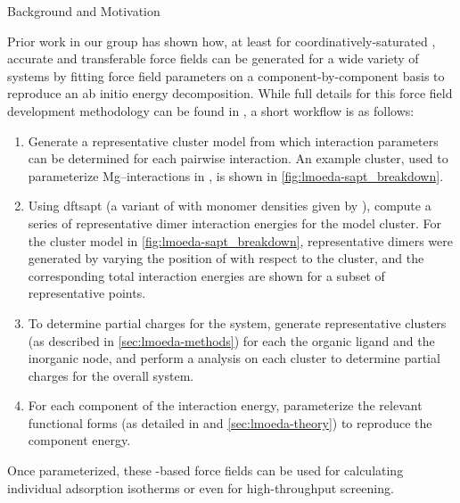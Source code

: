 \begin{section}{Background and Motivation}
\label{sec:lmoeda-background}

Prior work in our group has shown how, at least for coordinatively-saturated \mofs,
accurate and transferable force fields can be generated for a wide variety of
systems by fitting force field parameters on a component-by-component basis to
reproduce an ab initio \sapt energy
decomposition.\cite{McDaniel2012,McDaniel2012a} 
While full details for this force field development methodology can be found
in , a short workflow is as follows:
%
\begin{enumerate}
\item 
Generate a representative cluster model
from which interaction parameters can be determined for each pairwise
interaction.
An example cluster, used to parameterize Mg--\co interactions in \mgmof, is
shown in \cref{fig:lmoeda-sapt_breakdown}.
%
\item 
Using \acrshort{dftsapt} (a variant of \sapt with monomer densities given
by \dft), compute a series of representative dimer interaction energies for the model
cluster. For the cluster model in \cref{fig:lmoeda-sapt_breakdown},
representative dimers were generated by varying the position of \co with
respect to the \mof cluster, and the corresponding \dftsapt total interaction
energies are shown for a subset of representative points.
%
\item
To determine partial charges for the system, generate representative clusters
(as described in \cref{sec:lmoeda-methods}) for each the organic ligand and
the inorganic node, and perform a \dma analysis on each cluster to determine
partial charges for the overall system.
%
\item 
For each component of the \dftsapt interaction energy, 
parameterize the relevant functional forms (as detailed in  and
\cref{sec:lmoeda-theory}) to reproduce the \dftsapt component energy.
\end{enumerate}

Once parameterized, these \sapt-based \mof force fields can be used
for calculating individual adsorption isotherms or even for high-throughput
screening.\cite{McDaniel2015} 


\end{section}
